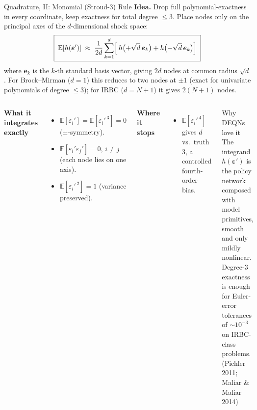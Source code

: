 \documentclass[aspectratio=169,11pt]{beamer}
\newcommand{\emphc}[1]{\textcolor{harvardcrimson}{#1}}
\newcommand{\E}[1]{\mathbb{E}\!\left[#1\right]}
\begin{document}
\begin{frame}{Quadrature, II: Monomial (Stroud-3) Rule}
\footnotesize
\textbf{Idea.} Drop full polynomial-exactness in every coordinate, keep exactness for total degree $\le 3$. Place nodes only on the principal axes of the $d$-dimensional shock space:
\[
\boxed{\;
\E{h(\bm\varepsilon')} \;\approx\; \frac{1}{2d} \sum_{k=1}^{d} \Bigl[\, h\bigl(+\sqrt{d}\,\bm{e}_k\bigr) + h\bigl(-\sqrt{d}\,\bm{e}_k\bigr)\Bigr]
\;}
\]
where $\bm{e}_k$ is the $k$-th standard basis vector, giving $2d$ nodes at common radius $\sqrt{d}$.  For Brock--Mirman ($d=1$) this reduces to two nodes at $\pm 1$ (exact for univariate polynomials of degree $\le 3$); for IRBC ($d=N+1$) it gives $2(N+1)$ nodes.

\vspace{0.5em}
\begin{columns}[T]
\textbf{What it integrates exactly}
\begin{itemize}\itemsep1pt
    \item $\mathbb{E}[\varepsilon_i'] = \mathbb{E}[\varepsilon_i'^{\,3}] = 0$ ($\pm$-symmetry).
    \item $\mathbb{E}[\varepsilon_i' \varepsilon_j'] = 0$, $i \neq j$ (each node lies on one axis).
    \item $\mathbb{E}[\varepsilon_i'^{\,2}] = 1$ (variance preserved).
\end{itemize}
\textbf{Where it stops}
\begin{itemize}\itemsep1pt
    \item $\mathbb{E}[\varepsilon_i'^{\,4}]$ gives $d$ vs.\ truth $3$, a controlled fourth-order bias.
\end{itemize}

\begin{block}{Why DEQNs love it}
\scriptsize
The integrand $h(\bm\varepsilon')$ is the policy network composed with model primitives, smooth and only mildly nonlinear. Degree-3 exactness is enough for Euler-error tolerances of $\sim\!10^{-3}$ on IRBC-class problems.\\[2pt]
\emphc{(Pichler 2011; Maliar \& Maliar 2014)}
\end{block}
\end{columns}
\end{frame}
\end{document}
